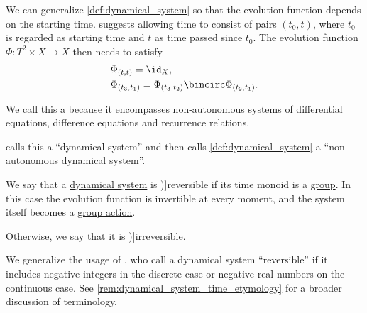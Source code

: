 \begin{definition}\label{def:non_autonomous_dynamical_system}\mimprovised
  We can generalize \cref{def:dynamical_system} so that the evolution function depends on the starting time. \Textcite[18]{Müller2022HandbookOfDynamicsAndProbability} suggests allowing time to consist of pairs \( (t_0, t) \), where \( t_0 \) is regarded as starting time and \( t \) as time passed since \( t_0 \). The evolution function \( \Phi: T^2 \times X \to X \) then needs to satisfy
  \begin{align}
    &\Phi_{(t, t)} = \id_X,                                            \label{eq:def:non_autonomous_dynamical_system/identity} \\
    &\Phi_{(t_3, t_1)} = \Phi_{(t_3, t_2)} \bincirc \Phi_{(t_2, t_1)}. \label{eq:def:non_autonomous_dynamical_system/compatibility}
  \end{align}

  We call this a  because it encompasses non-autonomous systems of differential equations, difference equations and recurrence relations.
\end{definition}
\begin{comments}
  \item \Textcite[18]{Müller2022HandbookOfDynamicsAndProbability} calls this a \enquote{dynamical system} and then calls \cref{def:dynamical_system} a \enquote{non-autonomous dynamical system}.
\end{comments}

\begin{definition}\label{def:reversible_dynamical_system}\mimprovised
  We say that a \hyperref[def:dynamical_system]{dynamical system} is \term[en=reversible (\cite[1]{HasselblattKatok1995DynamicalSystems})]{reversible} if its time monoid is a \hyperref[def:group]{group}. In this case the evolution function is invertible at every moment, and the system itself becomes a \hyperref[def:group_action]{group action}.

  Otherwise, we say that it is \term[en=irreversible (\cite[1]{HasselblattKatok1995DynamicalSystems})]{irreversible}.
\end{definition}
\begin{comments}
  \item We generalize the usage of \textcite[1]{HasselblattKatok1995DynamicalSystems}, who call a dynamical system \enquote{reversible} if it includes negative integers in the discrete case or negative real numbers on the continuous case. See \cref{rem:dynamical_system_time_etymology} for a broader discussion of terminology.
\end{comments}

